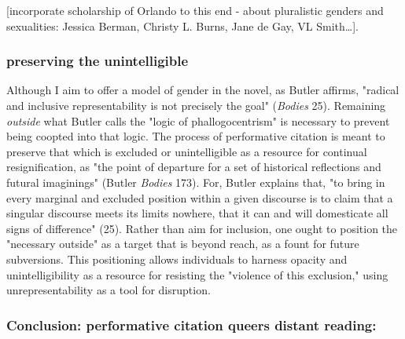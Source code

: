 \documentclass[11pt]{article}
\begin{document}
[incorporate scholarship of Orlando to this end - about pluralistic
genders and sexualities: Jessica Berman, Christy L. Burns, Jane de
Gay, VL Smith\ldots{}].

\subsubsection{preserving the unintelligible}
\label{sec:org33b155f}

Although I aim to offer a model of gender in the novel, as Butler
affirms, "radical and inclusive representability is not precisely the
goal" (\emph{Bodies} 25). Remaining \emph{outside} what Butler calls the "logic
of phallogocentrism" is necessary to prevent being coopted into that
logic. The process of performative citation is meant to preserve that
which is excluded or unintelligible as a resource for continual
resignification, as "the point of departure for a set of historical
reflections and futural imaginings" (Butler \emph{Bodies} 173). For, Butler
explains that, "to bring in every marginal and excluded position
within a given discourse is to claim that a singular discourse meets
its limits nowhere, that it can and will domesticate all signs of
difference" (25). Rather than aim for inclusion, one ought to position
the "necessary outside" as a target that is beyond reach, as a fount
for future subversions. This positioning allows individuals to harness
opacity and unintelligibility as a resource for resisting the
"violence of this exclusion," using unrepresentability as a tool for
disruption. 

\subsubsection{Conclusion: performative citation queers distant reading:}
\label{sec:org2bbfbbc}
\end{document}
